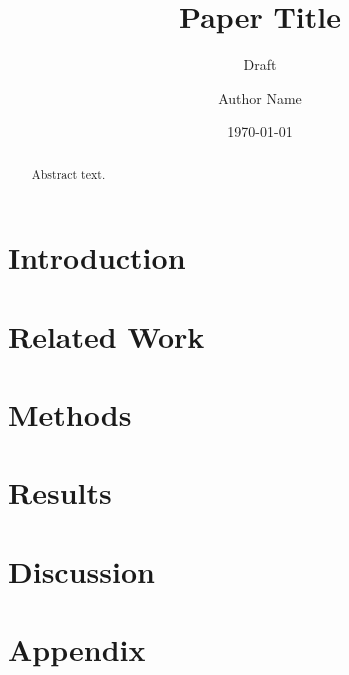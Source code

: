 \documentclass[twoside]{article}
\title{Paper Title}
\subtitle{Draft}
\author{Author Name}
\date{\today}
\begin{document}
    \maketitle

    \begin{abstract}
        Abstract text.
    \end{abstract}

    \section{Introduction}

    \section{Related Work}

    \section{Methods}

    \section{Results}

    \section{Discussion}

    \appendix
    \section{Appendix}

\end{document}
